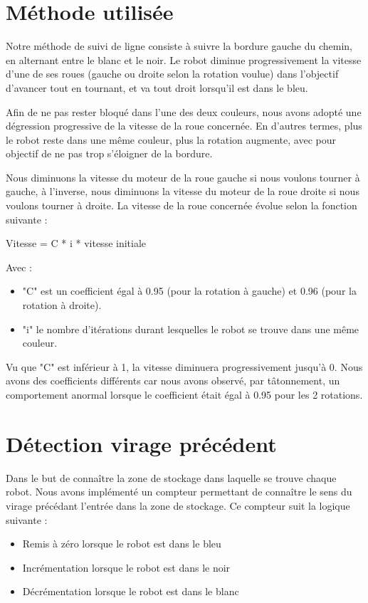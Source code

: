 \documentclass[french,a4paper,12pt]{report}
\begin{document}
\section{Méthode utilisée}
Notre méthode de suivi de ligne consiste à suivre la bordure gauche du chemin, en alternant entre le blanc et le noir. Le robot diminue progressivement la vitesse d’une de ses roues (gauche ou droite selon la rotation voulue) dans l’objectif d’avancer tout en tournant, et va tout droit lorsqu’il est dans le bleu.

Afin de ne pas rester bloqué dans l'une des deux couleurs, nous avons adopté une dégression progressive de la vitesse de la roue concernée. En d'autres termes, plus le robot reste dans une même couleur, plus la rotation augmente, avec pour objectif de ne pas trop s'éloigner de la bordure.

Nous diminuons la vitesse du moteur de la roue gauche si nous voulons tourner à gauche, à l’inverse, nous diminuons la vitesse du moteur de la roue droite si nous voulons tourner à droite. La vitesse de la roue concernée évolue selon la fonction suivante :

Vitesse = C * i * vitesse initiale

Avec :
\begin{itemize}
\item "C" est un coefficient égal à 0.95 (pour la rotation à gauche) et 0.96 (pour la rotation à droite).

\item "i" le nombre d’itérations durant lesquelles le robot se trouve dans une même couleur.
\end{itemize}

Vu que "C" est inférieur à 1, la vitesse diminuera progressivement jusqu’à 0.
Nous avons des coefficients différents car nous avons observé, par tâtonnement, un comportement anormal lorsque le coefficient était égal à 0.95 pour les 2 rotations.

\section{Détection virage précédent}
Dans le but de connaître la zone de stockage dans laquelle se trouve chaque robot. Nous avons implémenté un compteur permettant de connaître le sens du virage précédant l’entrée dans la zone de stockage.
Ce compteur suit la logique suivante :
\begin{itemize}
\item Remis à zéro lorsque le robot est dans le bleu

\item Incrémentation lorsque le robot est dans le noir

\item Décrémentation lorsque le robot est dans le blanc
\end{itemize}
\end{document}
